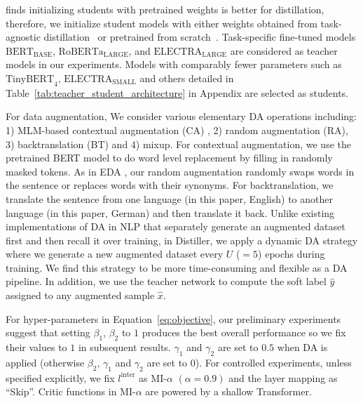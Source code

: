 \documentclass[11pt]{article}
\begin{document}
\citep{turc2019well} finds initializing students with pretrained weights is better for distillation, therefore, we initialize student models with either weights obtained from task-agnostic  distillation~\citep{jiao2019tinybert} or pretrained from scratch~\citep{turc2019well}. Task-specific fine-tuned models $\text{BERT}_\text{BASE}$, $\text{RoBERTa}_\text{LARGE}$, and $\text{ELECTRA}_\text{LARGE}$ are considered as teacher models in our experiments. Models with comparably fewer parameters such as $\text{TinyBERT}_4$, $\text{ELECTRA}_\text{SMALL}$ and others detailed in Table~\ref{tab:teacher_student_architecture} in Appendix are selected as students.

For data augmentation, We consider various elementary DA operations including: 1) MLM-based contextual augmentation (CA) , 2) random augmentation (RA), 3) backtranslation (BT) and 4) mixup. For contextual augmentation, we use the pretrained BERT model to do word level replacement by filling in randomly masked tokens. As in EDA  \citep{wei2019eda}, our random augmentation randomly swaps words in the sentence or replaces words with their synonyms. For backtranslation, we translate the sentence from one language (in this paper, English) to another language (in this paper, German) and then translate it back. Unlike existing implementations of DA in NLP that separately generate an augmented dataset first and then recall it over training, in Distiller, we apply a dynamic DA strategy where we generate a new augmented dataset every $U$ ($=5$) epochs during training. We find this strategy to be more time-consuming and flexible as a DA pipeline. In addition, we use the teacher network to compute the soft label $\hat{y}$ assigned to any augmented sample $\hat{x}$.

For hyper-parameters in Equation~\ref{eq:objective}, our preliminary experiments suggest that setting $\beta_1$, $\beta_2$ to $1$ produces the best overall performance so we fix their values to $1$ in subsequent results. $\gamma_1$ and $\gamma_2$ are set to $0.5$ when DA is applied (otherwise $\beta_2$, $\gamma_1$ and $\gamma_2$ are set to $0$). For controlled experiments, unless specified explicitly, we fix ${l^\text{inter}}$ as MI-$\alpha$ $(\alpha=0.9)$ and the layer mapping as ``Skip''. Critic functions in MI-$\alpha$ are powered by a shallow Transformer.  
\end{document}
